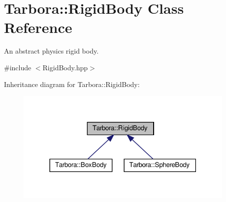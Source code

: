 \hypertarget{classTarbora_1_1RigidBody}{}\section{Tarbora\+:\+:Rigid\+Body Class Reference}
\label{classTarbora_1_1RigidBody}


An abstract physics rigid body.  




{\ttfamily \#include $<$Rigid\+Body.\+hpp$>$}



Inheritance diagram for Tarbora\+:\+:Rigid\+Body\+:\nopagebreak
\begin{figure}[H]
\begin{center}
\leavevmode
\includegraphics[width=302pt]{classTarbora_1_1RigidBody__inherit__graph}
\end{center}
\end{figure}
